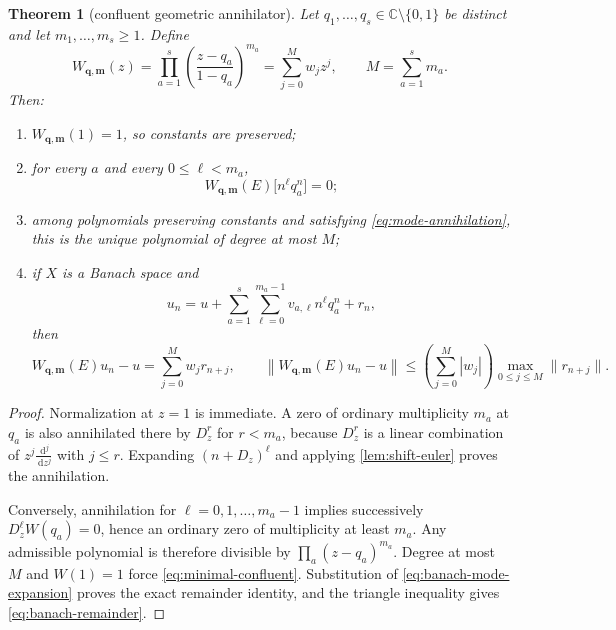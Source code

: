 \documentclass[11pt,oneside]{article}
\numberwithin{equation}{section}
\newtheorem{theorem}{Theorem}[section]
\theoremstyle{definition}
\theoremstyle{remark}
\newcommand{\C}{\mathbb C}
\newcommand{\dd}{\,\mathrm d}
\begin{document}
\begin{theorem}[confluent geometric annihilator]
\label{thm:confluent-annihilator}
Let $q_1,\ldots,q_s\in\C\setminus\{0,1\}$ be distinct and let
$m_1,\ldots,m_s\ge1$.  Define
\begin{equation}
 W_{\bm q,\bm m}(z)
 =\prod_{a=1}^{s}\left(\frac{z-q_a}{1-q_a}\right)^{m_a}
 =\sum_{j=0}^{M}w_jz^j,
 \qquad M=\sum_{a=1}^{s}m_a.
 \label{eq:minimal-confluent}
\end{equation}
Then:
\begin{enumerate}
\item $W_{\bm q,\bm m}(1)=1$, so constants are preserved;
\item for every $a$ and every $0\le\ell<m_a$,
\begin{equation}
 W_{\bm q,\bm m}(E)\bigl[n^\ell q_a^n\bigr]=0;
 \label{eq:mode-annihilation}
\end{equation}
\item among polynomials preserving constants and satisfying
\eqref{eq:mode-annihilation}, this is the unique polynomial of degree at most $M$;
\item if $X$ is a Banach space and
\begin{equation}
 u_n=u+\sum_{a=1}^{s}\sum_{\ell=0}^{m_a-1}v_{a,\ell}n^\ell q_a^n+r_n,
 \label{eq:banach-mode-expansion}
\end{equation}
then
\begin{equation}
 W_{\bm q,\bm m}(E)u_n-u
 =\sum_{j=0}^{M}w_jr_{n+j},
 \qquad
 \left\|W_{\bm q,\bm m}(E)u_n-u\right\|
 \le\left(\sum_{j=0}^{M}|w_j|\right)
 \max_{0\le j\le M}\|r_{n+j}\|.
 \label{eq:banach-remainder}
\end{equation}
\end{enumerate}
\end{theorem}

\begin{proof}
Normalization at $z=1$ is immediate.  A zero of ordinary multiplicity $m_a$ at $q_a$
is also annihilated there by $D_z^r$ for $r<m_a$, because $D_z^r$ is a linear
combination of $z^j\frac{\dd^j}{\dd z^j}$ with $j\le r$.  Expanding
$(n+D_z)^\ell$ and applying \cref{lem:shift-euler} proves the annihilation.

Conversely, annihilation for $\ell=0,1,\ldots,m_a-1$ implies successively
$D_z^\ell W(q_a)=0$, hence an ordinary zero of multiplicity at least $m_a$.  Any
admissible polynomial is therefore divisible by $\prod_a(z-q_a)^{m_a}$.  Degree at most
$M$ and $W(1)=1$ force \eqref{eq:minimal-confluent}.  Substitution of
\eqref{eq:banach-mode-expansion} proves the exact remainder identity, and the triangle
inequality gives \eqref{eq:banach-remainder}.
\end{proof}
\end{document}
